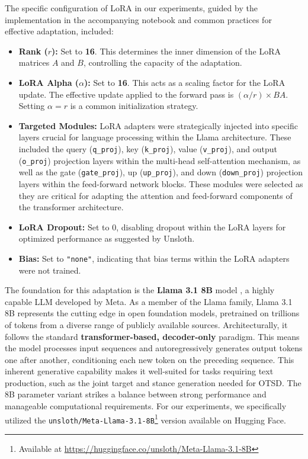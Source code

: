 \documentclass[twocolumn,11pt,letterpaper]{article}
\begin{document}
The specific configuration of LoRA in our experiments, guided by the implementation in the accompanying notebook and common practices for effective adaptation, included:
\begin{itemize}
    \item \textbf{Rank ($r$):} Set to \textbf{16}. This determines the inner dimension of the LoRA matrices $A$ and $B$, controlling the capacity of the adaptation.
    \item \textbf{LoRA Alpha ($\alpha$):} Set to \textbf{16}. This acts as a scaling factor for the LoRA update. The effective update applied to the forward pass is $(\alpha / r) \times BA$. Setting $\alpha = r$ is a common initialization strategy.
    \item \textbf{Targeted Modules:} LoRA adapters were strategically injected into specific layers crucial for language processing within the Llama architecture. These included the query (\texttt{q\_proj}), key (\texttt{k\_proj}), value (\texttt{v\_proj}), and output (\texttt{o\_proj}) projection layers within the multi-head self-attention mechanism, as well as the gate (\texttt{gate\_proj}), up (\texttt{up\_proj}), and down (\texttt{down\_proj}) projection layers within the feed-forward network blocks. These modules were selected as they are critical for adapting the attention and feed-forward components of the transformer architecture.
    \item \textbf{LoRA Dropout:} Set to 0, disabling dropout within the LoRA layers for optimized performance as suggested by Unsloth.
    \item \textbf{Bias:} Set to \texttt{"none"}, indicating that bias terms within the LoRA adapters were not trained.
\end{itemize}

The foundation for this adaptation is the \textbf{Llama 3.1 8B} model \cite{llama3.1}, a highly capable LLM developed by Meta. As a member of the Llama family, Llama 3.1 8B represents the cutting edge in open foundation models, pretrained on trillions of tokens from a diverse range of publicly available sources. Architecturally, it follows the standard \textbf{transformer-based, decoder-only} paradigm. This means the model processes input sequences and autoregressively generates output tokens one after another, conditioning each new token on the preceding sequence. This inherent generative capability makes it well-suited for tasks requiring text production, such as the joint target and stance generation needed for OTSD. The 8B parameter variant strikes a balance between strong performance and manageable computational requirements. For our experiments, we specifically utilized the \texttt{unsloth/Meta-Llama-3.1-8B}\footnote{Available at \url{https://huggingface.co/unsloth/Meta-Llama-3.1-8B}} version available on Hugging Face.
\end{document}
